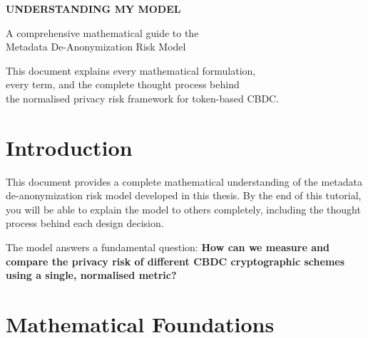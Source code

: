 \documentclass[12pt,a4paper,oneside,openany]{report}
\begin{document}
\begin{titlepage}
\centering
\vspace*{3cm}

{\Large\textbf{UNDERSTANDING MY MODEL}}

\vspace{2cm}

{\normalsize A comprehensive mathematical guide to the}
\\
{\normalsize Metadata De-Anonymization Risk Model}

\vspace{3cm}

{\normalsize This document explains every mathematical formulation,}
\\
{\normalsize every term, and the complete thought process behind}
\\
{\normalsize the normalised privacy risk framework for token-based CBDC.}

\end{titlepage}


\chapter{Introduction}
\label{chap:intro}

This document provides a complete mathematical understanding of the metadata de-anonymization risk model developed in this thesis. By the end of this tutorial, you will be able to explain the model to others completely, including the thought process behind each design decision.

The model answers a fundamental question: \textbf{How can we measure and compare the privacy risk of different CBDC cryptographic schemes using a single, normalised metric?}

\chapter{Mathematical Foundations}
\label{chap:foundations}
\end{document}
